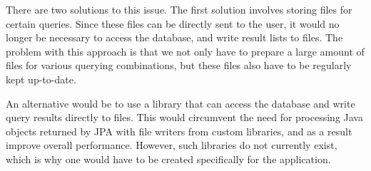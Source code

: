There are two solutions to this issue.
The first solution involves storing files for certain queries.
Since these files can be directly sent to the user, it would no longer be necessary to access the database, and write result lists to files.
The problem with this approach is that we not only have to prepare a large amount of files for various querying combinations, but these files also have to be regularly kept up-to-date.

An alternative would be to use a library that can access the database and write query results directly to files.
This would circumvent the need for processing Java objects returned by JPA with file writers from custom libraries, and as a result improve overall performance.
However, such libraries do not currently exist, which is why one would have to be created specifically for the application.